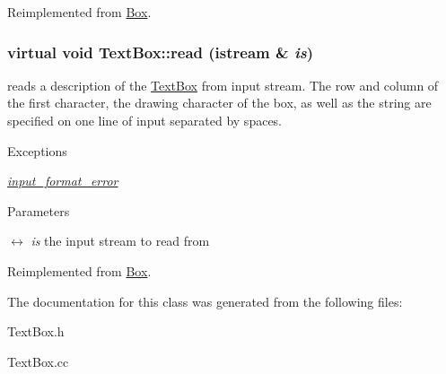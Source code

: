 Reimplemented from \hyperlink{classBox_a5c6c1c650b13f2978e3b559bb5af15d2}{Box}.\hypertarget{classTextBox_a3265df3298f92813667d1c70479f7f5c}{
\subsubsection[{read}]{\setlength{\rightskip}{0pt plus 5cm}virtual void TextBox::read (istream \& {\em is})}}
\label{classTextBox_a3265df3298f92813667d1c70479f7f5c}
reads a description of the \hyperlink{classTextBox}{TextBox} from input stream. The row and column of the first character, the drawing character of the box, as well as the string are specified on one line of input separated by spaces. 
\begin{DoxyExceptions}{Exceptions}
\item[{\em \hyperlink{classinput__format__error}{input\_\-format\_\-error}}]\end{DoxyExceptions}

\begin{DoxyParams}{Parameters}
\item[\mbox{$\leftrightarrow$} {\em is}]the input stream to read from \end{DoxyParams}


Reimplemented from \hyperlink{classBox_ac0ea633a10bf980901766b7aaefdb912}{Box}.

The documentation for this class was generated from the following files:\begin{DoxyCompactItemize}
\item 
TextBox.h\item 
TextBox.cc\end{DoxyCompactItemize}
